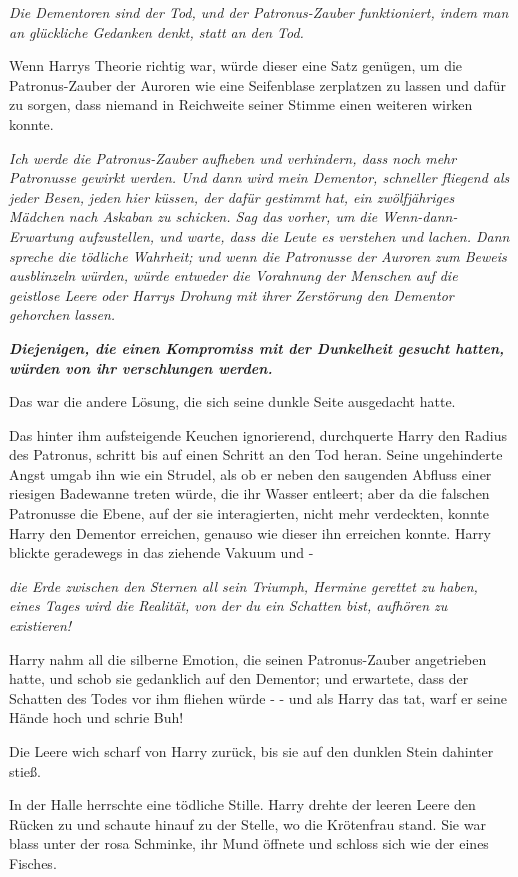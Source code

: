 \emph{Die Dementoren sind der Tod, und der Patronus-Zauber funktioniert, indem
man an glückliche Gedanken denkt, statt an den Tod.}

Wenn Harrys Theorie richtig war, würde dieser eine Satz genügen, um die
Patronus-Zauber der Auroren wie eine Seifenblase zerplatzen zu lassen und dafür
zu sorgen, dass niemand in Reichweite seiner Stimme einen weiteren wirken
konnte.

\emph{Ich werde die Patronus-Zauber aufheben und verhindern, dass noch mehr
Patronusse gewirkt werden. Und dann wird mein Dementor, schneller fliegend als
jeder Besen,} \emph{jeden hier küssen, der dafür gestimmt hat, ein zwölfjähriges
Mädchen nach Askaban zu schicken. Sag das vorher, um die Wenn-dann-Erwartung
aufzustellen, und warte, dass die Leute es verstehen und lachen. Dann spreche
die tödliche Wahrheit; und wenn die Patronusse der Auroren zum Beweis
ausblinzeln würden, würde entweder die Vorahnung der Menschen auf die geistlose
Leere oder Harrys Drohung mit ihrer Zerstörung den Dementor gehorchen lassen.}

\textbf{\emph{Diejenigen, die einen
Kompromiss mit der Dunkelheit gesucht hatten, würden von ihr verschlungen
werden.} }

Das war die andere Lösung, die sich seine dunkle Seite ausgedacht hatte.

Das hinter ihm aufsteigende Keuchen ignorierend, durchquerte Harry den Radius
des Patronus, schritt bis auf einen Schritt an den Tod heran. Seine ungehinderte
Angst umgab ihn wie ein Strudel, als ob er neben den saugenden Abfluss einer
riesigen Badewanne treten würde, die ihr Wasser entleert; aber da die falschen
Patronusse die Ebene, auf der sie interagierten, nicht mehr verdeckten, konnte
Harry den Dementor erreichen, genauso wie dieser ihn erreichen konnte. Harry
blickte geradewegs in das ziehende Vakuum und -

\emph{die Erde zwischen den Sternen all sein Triumph, Hermine gerettet zu haben,
eines Tages wird die Realität, von der du ein Schatten bist, aufhören zu
existieren!}

Harry nahm all die silberne Emotion, die seinen Patronus-Zauber angetrieben
hatte, und schob sie gedanklich auf den Dementor; und erwartete, dass der
Schatten des Todes vor ihm fliehen würde - - und als Harry das tat, warf er
seine Hände hoch und schrie \glqq{}Buh!\grqq{}

Die Leere wich scharf von Harry zurück, bis sie auf den dunklen Stein dahinter
stieß.

In der Halle herrschte eine tödliche Stille. Harry drehte der leeren Leere den
Rücken zu und schaute hinauf zu der Stelle, wo die Krötenfrau stand. Sie war
blass unter der rosa Schminke, ihr Mund öffnete und schloss sich wie der eines
Fisches.

